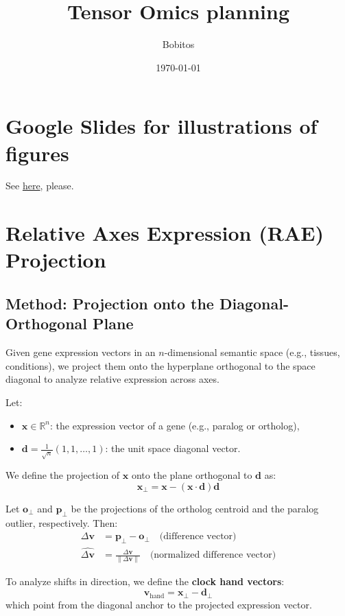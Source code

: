 \documentclass[11pt,a4paper]{article}
\title{Tensor Omics planning}
\author{Bobitos}
\date{\today}
\begin{document}
\maketitle

\section{Google Slides for illustrations of figures}

See \href{https://docs.google.com/presentation/d/1T9e2uZamu__GOxcbz7fM81QUgAlvKp5JjUTwnGWbz3w/edit?usp=sharing}{here}, please.

\section{Relative Axes Expression (RAE) Projection}

\subsection{Method: Projection onto the Diagonal-Orthogonal Plane}

Given gene expression vectors in an $n$-dimensional semantic space (e.g., tissues, conditions), we project them onto the hyperplane orthogonal to the space diagonal to analyze relative expression across axes.

Let:
\begin{itemize}
  \item $\mathbf{x} \in \mathbb{R}^n$: the expression vector of a gene (e.g., paralog or ortholog),
  \item $\mathbf{d} = \frac{1}{\sqrt{n}}(1, 1, \dots, 1)$: the unit space diagonal vector.
\end{itemize}

We define the projection of $\mathbf{x}$ onto the plane orthogonal to $\mathbf{d}$ as:
\[
\mathbf{x}_{\perp} = \mathbf{x} - (\mathbf{x} \cdot \mathbf{d}) \mathbf{d}
\]

Let $\mathbf{o}_{\perp}$ and $\mathbf{p}_{\perp}$ be the projections of the ortholog centroid and the paralog outlier, respectively. Then:
\begin{align*}
\Delta \mathbf{v} &= \mathbf{p}_{\perp} - \mathbf{o}_{\perp} \quad \text{(difference vector)} \\
\hat{\Delta \mathbf{v}} &= \frac{\Delta \mathbf{v}}{\|\Delta \mathbf{v}\|} \quad \text{(normalized difference vector)}
\end{align*}

To analyze shifts in direction, we define the \textbf{clock hand vectors}:
\[
\mathbf{v}_{\text{hand}} = \mathbf{x}_{\perp} - \mathbf{d}_{\perp}
\]
which point from the diagonal anchor to the projected expression vector.
\end{document}
